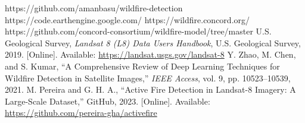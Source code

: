 \documentclass[conference]{IEEEtran}
\begin{document}
\vspace{0.4cm}
\begin{thebibliography}{00}
 https://github.com/amanbasu/wildfire-detection
 https://code.earthengine.google.com/
 https://wildfire.concord.org/
 https://github.com/concord-consortium/wildfire-model/tree/master
 U.S. Geological Survey, \emph{Landsat 8 (L8) Data Users Handbook}, U.S. Geological Survey, 2019. [Online]. Available: \url{https://landsat.usgs.gov/landsat-8}
 Y. Zhao, M. Chen, and S. Kumar, ``A Comprehensive Review of Deep Learning Techniques for Wildfire Detection in Satellite Images,'' \emph{IEEE Access}, vol. 9, pp. 10523--10539, 2021.
 M. Pereira and G. H. A., ``Active Fire Detection in Landsat-8 Imagery: A Large-Scale Dataset,'' GitHub, 2023. [Online]. Available: \url{https://github.com/pereira-gha/activefire}
\end{thebibliography}
\end{document}
